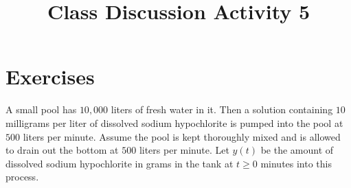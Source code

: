 \documentclass{ximera}
\begin{document}
\begin{abstract}
 \end{abstract}

    \title{Class Discussion Activity 5}
    
    \maketitle

\section*{Exercises}


A small pool has $10,000$ liters of fresh water in it. Then a solution containing $10$ milligrams per liter of dissolved sodium hypochlorite is pumped into the pool at $500$ liters per minute.  Assume the pool is kept thoroughly mixed and is allowed to drain out the bottom at $500$ liters per minute.  Let $y(t)$ be the amount of dissolved sodium hypochlorite in grams in the tank at $t\geq 0$ minutes into this process.

\end{document}
